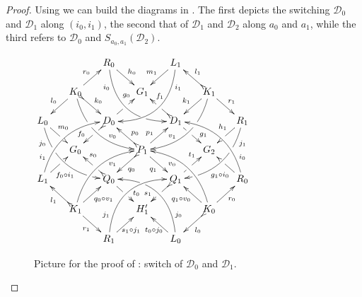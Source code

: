 \documentclass[a4paper,UKenglish,cleveref,pdftex,thm-restate,numberwithinsect,anonymous]{lipics}
\newcommand{\dder}[1]{\mathscr{#1}}
\begin{document}
\begin{proof}   
	Using  we can build the diagrams in .  The first depicts the  switching $\dder{D}_0$ and $\dder{D}_1$ along  $(i_0, i_1)$, the second that of $\dder{D}_1$ and $\dder{D}_2$ along $a_0$ and $a_1$, while the third refers to $\dder{D}_0$ and
	$S_{a_0,a_1}(\dder{D}_2)$.
	
	\begin{figure}[h]
		\centering
		$\xymatrix@C=15pt@R=15pt{&&R_0 \ar@/_.8cm/[ddrr]_(.2){i_0}|(.7)\hole
			\ar[dr]^{h_0}&& L_1\ar@/^.8cm/[ddll]^(.2){i_1}
			\ar[dl]_{m_1}\\&K_0\ar@{>->}[dr]^{k_0}\ar[dl]_{l_0}
			\ar@/_.6cm/[ddrr]|(.36)\hole^(.65){v_0}\ar[ur]^{r_0}&& G_1 &&
			K_1
			\ar@/^.6cm/[ddll]|(.36)\hole_(.65){v_1}\ar[dl]_{k_1}\ar@{>->}[lu]_{l_1}
			\ar[dr]^{r_1}\\L_0
			\ar@/_.6cm/[ddrr]_(.2){j_0}|(.31)\hole|(.81)\hole
			\ar[dr]^(.4){m_0}|(.61)\hole && D_0
			\ar@{>->}[dl]|(.4)\hole_(.65){f_0}\ar[ur]|(.5)\hole^(.7){g_0}&&D_1
			\ar[dr]|(.4)\hole^(.65){g_1}
			\ar@{>->}[ul]|(.5)\hole_(.65){f_1}&&R_1\ar@/^.6cm/[ddll]^(.2){j_1}|(.31)\hole|(.81)\hole\ar[dl]_(.4){h_1}|(.6)\hole\\&G_0
			&&P_1\ar[dr]_{q_1}
			\ar@{>->}[dl]^{q_0}\ar[ur]^(.4){p_1}\ar@{>->}[ul]_(.4){p_0}&&G_2\\L_1
			\ar@/^.6cm/[uurr]^(.2){i_1} \ar[ur]_(.35){f_0\circ
				i_1}|(.61)\hole&&Q_0
			\ar@{>->}[ul]|(.4)\hole_(.65){s_0}\ar[dr]|(.5)\hole^(.65){t_0}
			&&Q_1\ar[ur]|(.4)\hole^(.65){t_1} \ar@{>->}[dl]|(.5)\hole_(.65){s_1}
			&& R_0 \ar[ul]^(.35){g_1\circ
				i_0}|(.61)\hole\ar@/_.6cm/[uull]_(.2){i_0}\\&K_1
			\ar[ur]_{q_0\circ v_1} \ar[dr]_{r_1}
			\ar@{>->}[ul]^{l_1}\ar@/^.6cm/[uurr]_(.65){v_1}&&H'_1&& K_0
			\ar[ur]_{r_0} \ar[ul]^{q_1\circ v_0} \ar@{>->}[dl]^{l_0}
			\ar@/_.6cm/[uull]^(.65){v_0}\\&& R_1
			\ar[ur]_{\hspace{-6pt}s_1\circ
				j_1}\ar@/^.8cm/[uurr]^(.2){j_1}&& L_0 \ar[ul]^{t_0\circ
				j_0\hspace{-6pt}} \ar@/_.8cm/[uull]_(.2){j_0} |(.69)\hole
		}	$
		\caption{Picture for the proof of : switch of $\dder{D}_0$ and $\dder{D}_1$.}
		\label{fi:first}
	\end{figure}
	

\end{proof}
\end{document}
